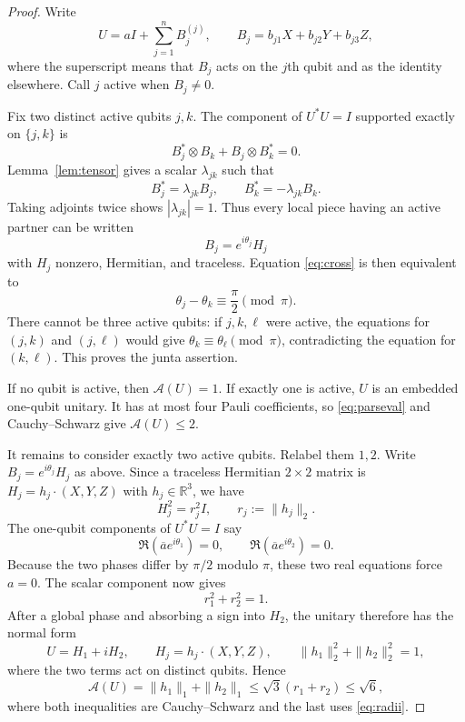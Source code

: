 \documentclass[11pt]{article}
\newcommand{\A}{\mathcal A}
\begin{document}
\begin{proof}
Write
\begin{equation}\label{eq:decomp}
 U=aI+\sum_{j=1}^n B_j^{(j)},
 \qquad
 B_j=b_{j1}X+b_{j2}Y+b_{j3}Z,
\end{equation}
where the superscript means that $B_j$ acts on the $j$th qubit and as the
identity elsewhere.  Call $j$ active when $B_j\ne0$.

Fix two distinct active qubits $j,k$.  The component of $U^*U=I$ supported
exactly on $\{j,k\}$ is
\begin{equation}\label{eq:cross}
 B_j^*\otimes B_k+B_j\otimes B_k^*=0.
\end{equation}
Lemma~\ref{lem:tensor} gives a scalar $\lambda_{jk}$ such that
\[
 B_j^*=\lambda_{jk}B_j,
 \qquad B_k^*=-\lambda_{jk}B_k.
\]
Taking adjoints twice shows $|\lambda_{jk}|=1$.  Thus every local piece having
an active partner can be written
\[
 B_j=e^{i\theta_j}H_j
\]
with $H_j$ nonzero, Hermitian, and traceless.  Equation
\eqref{eq:cross} is then equivalent to
\begin{equation}\label{eq:phase}
 \theta_j-\theta_k\equiv\frac{\pi}{2}\pmod\pi.
\end{equation}
There cannot be three active qubits: if $j,k,\ell$ were active, the equations
for $(j,k)$ and $(j,\ell)$ would give
$\theta_k\equiv\theta_\ell\pmod\pi$, contradicting the equation for
$(k,\ell)$.  This proves the junta assertion.

If no qubit is active, then $\A(U)=1$.  If exactly one is active, $U$ is an
embedded one-qubit unitary.  It has at most four Pauli coefficients, so
\eqref{eq:parseval} and Cauchy--Schwarz give $\A(U)\le2$.

It remains to consider exactly two active qubits.  Relabel them $1,2$.  Write
$B_j=e^{i\theta_j}H_j$ as above.  Since a traceless Hermitian $2\times2$
matrix is $H_j=h_j\cdot(X,Y,Z)$ with $h_j\in\mathbb R^3$, we have
\[
 H_j^2=r_j^2I,\qquad r_j:=\|h_j\|_2.
\]
The one-qubit components of $U^*U=I$ say
\[
 \Re(\overline a e^{i\theta_1})=0,
 \qquad
 \Re(\overline a e^{i\theta_2})=0.
\]
Because the two phases differ by $\pi/2$ modulo $\pi$, these two real
equations force $a=0$.  The scalar component now gives
\begin{equation}\label{eq:radii}
 r_1^2+r_2^2=1.
\end{equation}
After a global phase and absorbing a sign into $H_2$, the unitary therefore
has the normal form
\begin{equation}\label{eq:normal}
 U=H_1+iH_2,
 \qquad H_j=h_j\cdot(X,Y,Z),\qquad
 \|h_1\|_2^2+\|h_2\|_2^2=1,
\end{equation}
where the two terms act on distinct qubits.  Hence
\[
 \A(U)=\|h_1\|_1+\|h_2\|_1
 \le\sqrt3(r_1+r_2)
 \le\sqrt6,
\]
where both inequalities are Cauchy--Schwarz and the last uses
\eqref{eq:radii}.


\end{proof}
\end{document}
